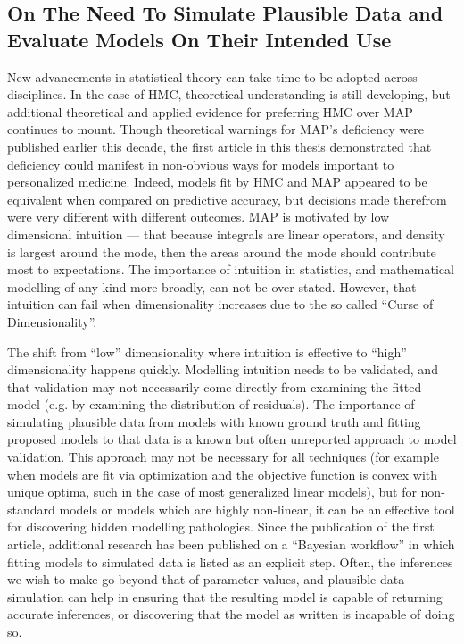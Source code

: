 \subsection{On The Need To Simulate Plausible Data and Evaluate Models On Their Intended Use}
New advancements in statistical theory can take time to be adopted across disciplines. In the case of HMC, theoretical understanding is still developing, but additional theoretical and applied evidence for preferring HMC over MAP continues to mount.  Though theoretical warnings for MAP's deficiency were published earlier this decade, the first article in this thesis demonstrated that deficiency could manifest in non-obvious ways for models important to personalized medicine.  Indeed, models fit by HMC and MAP appeared to be equivalent when compared on predictive accuracy, but decisions made therefrom were very different with different outcomes.  MAP is motivated by low dimensional intuition --- that because integrals are linear operators, and density is largest around the mode, then the areas around the mode should contribute most to expectations.  The importance of intuition in statistics, and mathematical modelling of any kind more broadly, can not be over stated.  However, that intuition can fail when dimensionality increases due to the so called ``Curse of Dimensionality''.

The shift from ``low'' dimensionality where intuition is effective to ``high'' dimensionality happens quickly. Modelling intuition needs to be validated, and that validation may not necessarily come directly from examining the fitted model (e.g. by examining the distribution of residuals).  The importance of simulating plausible data from models with known ground truth and fitting proposed models to that data is a known but often unreported approach to model validation.  This approach may not be necessary for all techniques (for example when models are fit via optimization and the objective function is convex with unique optima, such in the case of most generalized linear models), but for non-standard models or models which are highly non-linear, it can be an effective tool for discovering hidden modelling pathologies.  Since the publication of the first article, additional research has been published on a ``Bayesian workflow''  \cite{gelman_bayesian_2020} in which fitting models to simulated data is listed as an explicit step.  Often, the inferences we wish to make go beyond that of parameter values, and plausible data simulation can help in ensuring that the resulting model is capable of returning accurate inferences, or discovering that the model as written is incapable of doing so.

